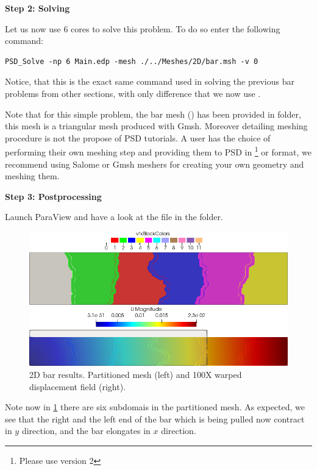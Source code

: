 \textbf{Step 2: Solving}

Let us now use 6 cores to solve this problem. To do so enter the
following command:

\begin{lstlisting}[style=BashInputStyle]
PSD_Solve -np 6 Main.edp -mesh ./../Meshes/2D/bar.msh -v 0
\end{lstlisting}

Notice, that this is the exact same command used in solving the previous
bar problems from other sections, with only difference that we now use
.

Note that for this simple problem, the bar mesh () has been
provided in  folder, this mesh is a triangular mesh
produced with Gmsh. Moreover detailing meshing procedure is not the
propose of PSD tutorials. A user has the choice of performing their own
meshing step and providing them to PSD in
\footnote{Please use version 2} or  format, we
recommend using Salome or Gmsh meshers for creating your own geometry
and meshing them.

\textbf{Step 3: Postprocessing}

Launch ParaView and have a look at the  file in the
 folder.

\begin{figure}[htbp]
    \centering
    \begin{minipage}[t][2cm][t]{0.36\textwidth}
    \includegraphics[align=b,width=1\textwidth]{./Images/2d-bar-partitioned6.png}
    \end{minipage}\hspace{.1\textwidth}
    \begin{minipage}[t][2cm][t]{0.5\textwidth}
    \includegraphics[align=b,width=1\textwidth]{./Images/2d-bar-clamped-traction-point.png}
    \end{minipage}
    \caption{2D bar results. Partitioned mesh (left) and 100X warped displacement field (right).}
    \label{fig:6part}
\end{figure}

Note now in \cref{fig:6part} there are six subdomais in the partitioned
mesh. As expected, we see that the right and the left end of the bar
which is being pulled now contract in \(y\) direction, and the bar
elongates in \(x\) direction.
